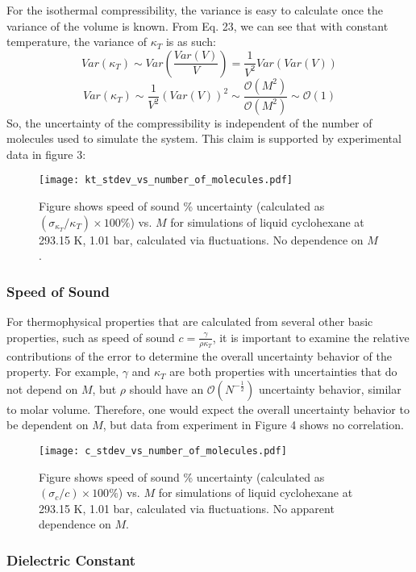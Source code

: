 \documentclass[9pt,bestpractices]{livecoms}
\begin{document}
For the isothermal compressibility, the variance is easy to calculate once the variance of the volume is known.  From Eq. 23, we can see that with constant temperature, the variance of $\kappa_T$ is as such:
\begin{equation}
Var(\kappa_T) \sim Var \left( \frac{Var(V)}{V}\right) = \frac{1}{V^2}Var(Var(V))
\end{equation}
\begin{equation}
Var(\kappa_T) \sim \frac{1}{V^2} (Var(V))^2 \sim \frac{\mathcal{O}(M^2)}{\mathcal{O}(M^2)} \sim \mathcal{O}(1)
\end{equation}
So, the uncertainty of the compressibility is independent of the number of molecules used to simulate the system.  This claim is supported by experimental data in figure 3:  
\begin{figure}[H]
\texttt{[image: kt\_stdev\_vs\_number\_of\_molecules.pdf]}
\caption{Figure shows speed of sound \% uncertainty (calculated as $(\sigma_{\kappa_T}/\kappa_T) \times 100 \%$) vs. $M$ for simulations of liquid cyclohexane at 293.15 K, 1.01 bar, calculated via fluctuations. No dependence on $M$.}
\end{figure}

\subsubsection{Speed of Sound}
For thermophysical properties that are calculated from several other basic properties, such as speed of sound $c=\frac{\gamma}{\rho \kappa_T}$, it is important to examine the relative contributions of the error to determine the overall uncertainty behavior of the property.  For example, $\gamma$ and $\kappa_T$ are both properties with uncertainties that do not depend on $M$, but $\rho$ should have an $\mathcal{O}(N^{-\frac{1}{2}})$ uncertainty behavior, similar to molar volume.  Therefore, one would expect the overall uncertainty behavior to be dependent on $M$, but data from experiment in Figure 4 shows no correlation. 
\begin{figure}[H]
\texttt{[image: c\_stdev\_vs\_number\_of\_molecules.pdf]}
\caption{Figure shows speed of sound \% uncertainty (calculated as $(\sigma_{c}/c) \times 100 \%$) vs. $M$ for simulations of liquid cyclohexane at 293.15 K, 1.01 bar, calculated via fluctuations. No apparent dependence on $M$.} 
\end{figure}

\subsubsection{Dielectric Constant}
\end{document}
